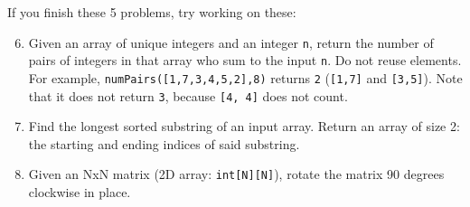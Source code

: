 \documentclass{article}
\begin{document}
If you finish these 5 problems, try working on these:


\begin{enumerate}\setcounter{enumi}{5}
    
    \item Given an array of unique integers and an integer \texttt{n}, return the number of pairs of integers in that array who sum to the input \texttt{n}. Do not reuse elements. For example, \texttt{numPairs([1,7,3,4,5,2],8)} returns \texttt{2} (\texttt{[1,7]} and \texttt{[3,5]}). Note that it does not return \texttt{3}, because \texttt{[4, 4]} does not count.

    \item Find the longest sorted substring of an input array. Return an array of size 2: the starting and ending indices of said substring.
    
    
    \item Given an NxN matrix (2D array: \texttt{int[N][N]}), rotate the matrix 90 degrees clockwise in place.
    
    
\end{enumerate}

\clearpage
\end{document}
